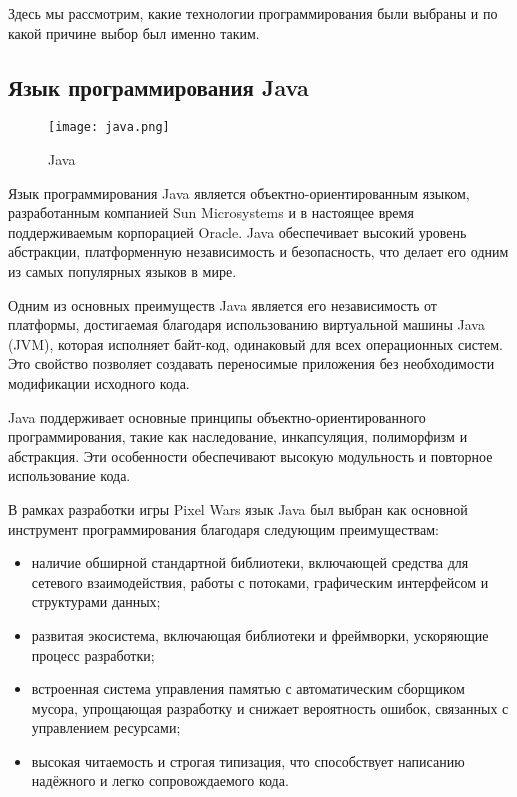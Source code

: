 Здесь мы рассмотрим, какие технологии программирования были
выбраны и по какой причине выбор был именно таким.

\subsection{Язык программирования Java}

\begin{figure}[H]
    \centering
    \texttt{[image: java.png]}
    \caption{Java}
\end{figure}

Язык программирования Java является объектно-ориентированным языком, разработанным компанией Sun Microsystems и в настоящее время поддерживаемым корпорацией Oracle. Java обеспечивает высокий уровень абстракции, платформенную независимость и безопасность, что делает его одним из самых популярных языков в мире.

Одним из основных преимуществ Java является его независимость от платформы, достигаемая благодаря использованию виртуальной машины Java (JVM), которая исполняет байт-код, одинаковый для всех операционных систем. Это свойство позволяет создавать переносимые приложения без необходимости модификации исходного кода.

Java поддерживает основные принципы объектно-ориентированного программирования, такие как наследование, инкапсуляция, полиморфизм и абстракция. Эти особенности обеспечивают высокую модульность и повторное использование кода. \cite{java}

В рамках разработки игры Pixel Wars язык Java был выбран как основной инструмент программирования благодаря следующим преимуществам:
\begin{itemize}
    \item наличие обширной стандартной библиотеки, включающей средства для сетевого взаимодействия, работы с потоками, графическим интерфейсом и структурами данных;
    \item развитая экосистема, включающая библиотеки и фреймворки, ускоряющие процесс разработки;
    \item встроенная система управления памятью с автоматическим сборщиком мусора, упрощающая разработку и снижает вероятность ошибок, связанных с управлением ресурсами;
    \item высокая читаемость и строгая типизация, что способствует написанию надёжного и легко сопровождаемого кода.
\end{itemize}

